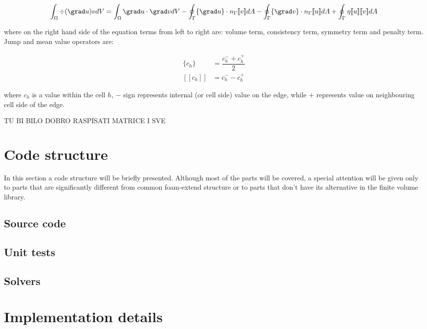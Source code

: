 \documentclass[11pt, a4paper]{article}
\begin{document}
\begin{equation}
    \int_\Omega \div (\grad u) v dV = \int_\Omega \grad u \cdot \grad v dV
    -\oint_\Gamma \{\grad u\} \cdot n_\Gamma [\![v]\!] dA
    -\oint_\Gamma \{\grad v\} \cdot n_\Gamma [\![u]\!] dA
    +\oint_\Gamma \eta [\![u]\!] [\![v]\!] dA
\label{eq:7}
\end{equation}

\noindent where on the right hand side of the equation terms from left to right
are: volume term, consistency term, symmetry term and penalty term. Jump and
mean value operators are:

\begin{align}
    \{c_h\} &= \dfrac{c_h^- + c_h^+}{2}\\
    [\![c_h]\!] &= c_h^- - c_h^+
\label{eq:8}
\end{align}

where $c_h$ is a value within the cell $h$, $-$ sign represents internal (or
cell side) value on the edge, while $+$ represents value on neighbouring cell
side of the edge.

TU BI BILO DOBRO RASPISATI MATRICE I SVE


\section{Code structure}
\label{sec:3}

In this section a code structure will be briefly presented. Although most of the
parts will be covered, a special attention will be given only to parts that are
significantly different from common foam-extend structure or to parts that don't
have its alternative in the finite volume library.

\subsection{Source code}

\subsection{Unit tests}

\subsection{Solvers}



\section{Implementation details}
\label{sec:4}
\end{document}
